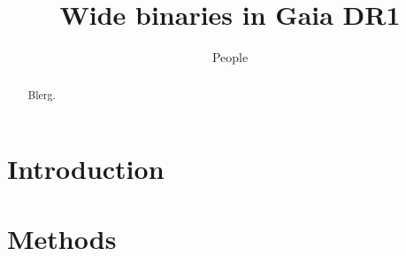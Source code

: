 \documentclass[manuscript, letterpaper]{aastex6}
\begin{document}
\sloppy\sloppypar\raggedbottom\frenchspacing %

\title{Wide binaries in Gaia DR1}
\author{People}



\begin{abstract}
Blerg.
\end{abstract}


\section{Introduction} \label{sec:intro}

\section{Methods} \label{sec:methods}
\end{document}
